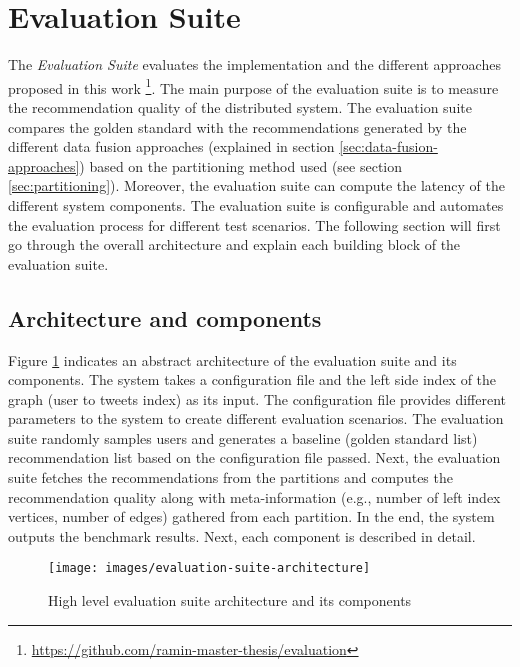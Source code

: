 \section{Evaluation Suite}
\label{sec:evaluation-suite}
The \emph{Evaluation Suite} evaluates the implementation and the different approaches proposed in this work \footnote{\url{https://github.com/ramin-master-thesis/evaluation}}. The main purpose of the evaluation suite is to measure the recommendation quality of the distributed system. The evaluation suite compares the golden standard with the recommendations generated by the different data fusion approaches (explained in section \ref{sec:data-fusion-approaches}) based on the partitioning method used (see section \ref{sec:partitioning}). Moreover, the evaluation suite can compute the latency of the different system components. The evaluation suite is configurable and automates the evaluation process for different test scenarios. The following section will first go through the overall architecture and explain each building block of the evaluation suite.


\subsection{Architecture and components}
\label{sec:eval-suite-architecture-components}
Figure \ref{fig:evaluation-suite-architecture} indicates an abstract architecture of the evaluation suite and its components. The system takes a configuration file and the left side index of the graph (user to tweets index) as its input. The configuration file provides different parameters to the system to create different evaluation scenarios. The evaluation suite randomly samples users and generates a baseline (golden standard list) recommendation list based on the configuration file passed. Next, the evaluation suite fetches the recommendations from the partitions and computes the recommendation quality along with meta-information (e.g., number of left index vertices, number of edges) gathered from each partition. In the end, the system outputs the benchmark results. Next, each component is described in detail.


\begin{figure}[!h]
    \centering
    \texttt{[image: images/evaluation-suite-architecture]}
    \caption{High level evaluation suite architecture and its components}
    \label{fig:evaluation-suite-architecture}
\end{figure}


